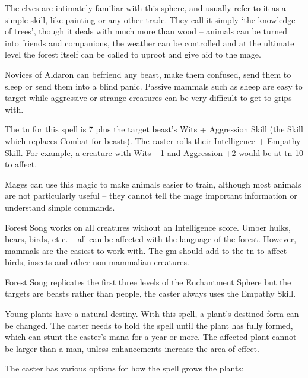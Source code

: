 \begin{multicols}{2}

\noindent
The elves are intimately familiar with this sphere, and usually refer to it as a simple skill, like painting or any other trade. They call it simply `the knowledge of trees', though it deals with much more than wood -- animals can be turned into friends and companions, the weather can be controlled and at the ultimate level the forest itself can be called to uproot and give aid to the mage.

\spelllevel

\label{forestsong}
Novices of Aldaron can befriend any beast, make them confused, send them to sleep or send them into a blind panic.
Passive mammals such as sheep are easy to target while aggressive or strange creatures can be very difficult to get to grips with.

The \gls{tn} for this spell is 7 plus the target beast's Wits + Aggression Skill (the Skill which replaces Combat for beasts). The caster rolls their Intelligence + Empathy Skill.
For example, a creature with Wits +1 and Aggression +2 would be at \gls{tn} 10 to affect.

Mages can use this magic to make animals easier to train, although most animals are not particularly useful -- they cannot tell the mage important information or understand simple commands.

Forest Song works on all creatures without an Intelligence score.
Umber hulks, bears, birds, et c. -- all can be affected with the language of the forest.
However, mammals are the easiest to work with.
The \gls{gm} should add to the \gls{tn} to affect birds, insects and other non-mammalian creatures.

Forest Song replicates the first three levels of the Enchantment Sphere but the targets are beasts rather than people, the caster always uses the Empathy Skill.

Young plants have a natural destiny.
With this spell, a plant's destined form can be changed.
The caster needs to hold the spell until the plant has fully formed, which can stunt the caster's mana for a year or more.
The affected plant cannot be larger than a man, unless enhancements increase the area of effect.

The caster has various options for how the spell grows the plants:


\end{multicols}
